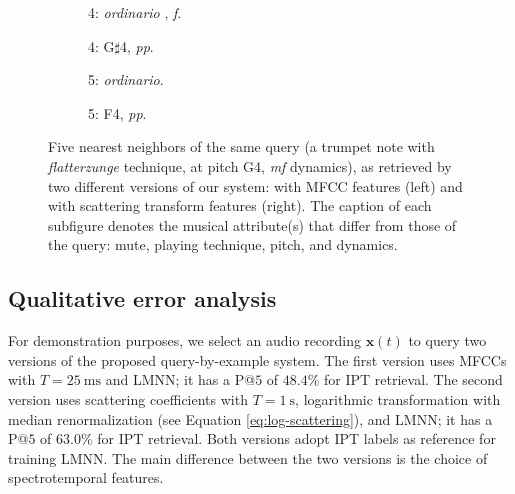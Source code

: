 \begin{figure}
        \begin{subfigure}{0.20\textwidth}
                \centering
                \caption*{4: \emph{ordinario}%
                , \emph{f}.}
                \label{fig:TpC-ord_flatt-F4-f}
        \end{subfigure}%
        \begin{subfigure}{0.20\textwidth}
                \centering
                \caption*{4: G$\sharp$4, \emph{pp}.}
                \label{fig:TpC-flatt-Gsh4-pp}
        \end{subfigure}%

        \begin{subfigure}{0.20\textwidth}
                \centering
                \caption*{5: \emph{ordinario}.}
                \label{fig:TpC-ord-G4-mf}
        \end{subfigure}%
        \begin{subfigure}{0.20\textwidth}
                \centering
                \caption*{5: F4, \emph{pp}.}
                \label{fig:TpC-flatt-F4-pp}
        \end{subfigure}%

        \caption{Five nearest neighbors of the same query (a trumpet note with \emph{flatterzunge} technique, at pitch G4, \emph{mf} dynamics), as retrieved by two different versions of our system: with MFCC features (left) and with scattering transform features (right).%
The caption of each subfigure denotes the musical attribute(s) that differ from those of the query: mute, playing technique, pitch, and dynamics.
}\label{fig:demo-extended}
\end{figure}

\subsection{Qualitative error analysis}
For demonstration purposes, we select an audio recording $\boldsymbol{x}(t)$ to query two versions of the proposed query-by-example system.
The first version uses MFCCs with $T=\SI{25}{\milli\second}$ and LMNN; it has a P@$5$ of $48.4\%$ for IPT retrieval.
The second version uses scattering coefficients with $T=\SI{1}{\second}$, logarithmic transformation with median renormalization (see Equation \ref{eq:log-scattering}), and LMNN; it has a P@$5$ of $63.0\%$ for IPT retrieval.
Both versions adopt IPT labels as reference for training LMNN.
The main difference between the two versions is the choice of spectrotemporal features.

